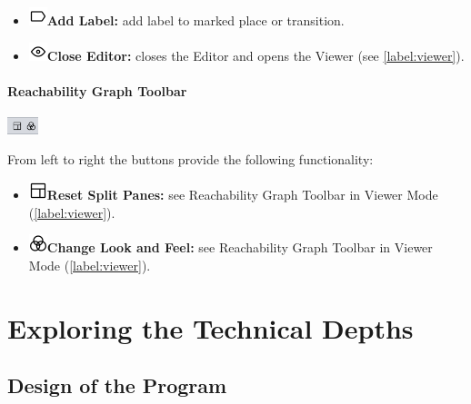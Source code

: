 \documentclass[10pt, a4paper]{article}
\begin{document}
\begin{itemize}
\item\includegraphics[scale=0.4]{../resources/images/Toolbar/label.png}\hspace{0.1cm}\textbf{Add Label:} add label to marked place or transition.
\item\includegraphics[scale=0.4]{../resources/images/Toolbar/eye.png}\hspace{0.1cm}\textbf{Close Editor:} closes the Editor and opens the Viewer (see \ref{label:viewer}).
\end{itemize}


\paragraph{Reachability Graph Toolbar}

\includegraphics[height=0.5cm]{Editor_Reachability.png}

From left to right the buttons provide the following functionality:
\begin{itemize}
\item\includegraphics[scale=0.4]{../resources/images/Toolbar/layout.png}\hspace{0.1cm}\textbf{Reset Split Panes:} see Reachability Graph Toolbar in Viewer Mode (\ref{label:viewer}).
\item\includegraphics[scale=0.4]{../resources/images/Toolbar/design.png}\hspace{0.1cm}\textbf{Change Look and Feel:} see Reachability Graph Toolbar in Viewer Mode (\ref{label:viewer}).
\end{itemize}

\section{Exploring the Technical Depths}


\subsection{Design of the Program}
\end{document}
